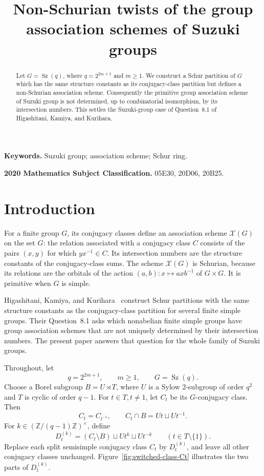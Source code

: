 \documentclass[11pt]{amsart}
\title{Non-Schurian twists of the group association schemes of Suzuki groups}
\author{}
\date{}
\numberwithin{equation}{section}
\theoremstyle{definition}
\theoremstyle{remark}
\newcommand{\Sz}{\operatorname{Sz}}
\newcommand{\X}{\mathcal X}
\begin{document}
\maketitle
\vspace{-1.5em}
\begin{abstract}
Let $G=\Sz(q)$, where $q=2^{2m+1}$ and $m\geq1$. 
We construct a Schur partition of $G$ which has the same structure constants as its conjugacy-class partition but defines a non-Schurian association scheme.
Consequently the primitive group association scheme of Suzuki group is not determined, up to combinatorial isomorphism, by its intersection numbers.
This settles the Suzuki-group case of Question~8.1 of Higashitani, Kamiya, and Kurihara.
\end{abstract}

\noindent\textbf{Keywords.} Suzuki group; association scheme; Schur ring.

\smallskip
\noindent\textbf{2020 Mathematics Subject Classification.}
05E30, 20D06, 20B25.

\section{Introduction}

For a finite group $G$, its conjugacy classes define an association scheme $\X(G)$ on the set $G$: the relation associated with a conjugacy class $C$ consists of the pairs $(x,y)$ for which $yx^{-1}\in C$. 
Its intersection numbers are the structure constants of the conjugacy-class sums.
The scheme $\X(G)$ is Schurian, because its relations are the orbitals of the action $(a,b):x\mapsto axb^{-1}$ of $G\times G$.
It is primitive when $G$ is simple.

Higashitani, Kamiya, and Kurihara~\cite{HKK} construct Schur partitions with the same structure constants as the conjugacy-class partition for several finite simple groups. 
Their Question~8.1 asks which nonabelian finite simple groups have group association schemes that are not uniquely determined by their intersection numbers. 
The present paper answers that question for the whole family of Suzuki groups.

Throughout, let
\[
 q=2^{2m+1},\qquad m\geq1,\qquad G=\Sz(q).
\]
Choose a Borel subgroup $B=U\rtimes T$, where $U$ is a Sylow $2$-subgroup of order $q^2$ and $T$ is cyclic of order $q-1$. 
For $t\in T, t\ne1$, let $C_t$ be its $G$-conjugacy class. Then
\[
 C_t=C_{t^{-1}},\qquad C_t\cap B=Ut\sqcup U{t^{-1}}.
\]
For $k\in(\mathbb Z/(q-1)\mathbb Z)^\times$, define
\begin{equation}\label{eq:switch-intro}
 D_t^{(k)}=(C_t\setminus B)\sqcup U{t^k}\sqcup U{t^{-k}}
 \qquad(t\in T\setminus\{1\}).
\end{equation}
Replace each split semisimple conjugacy class $C_t$ by $D_t^{(k)}$, and leave all other conjugacy classes unchanged. 
Figure~\ref{fig:switched-class-Ct} illustrates the two parts of $D_t^{(k)}$.
\end{document}
